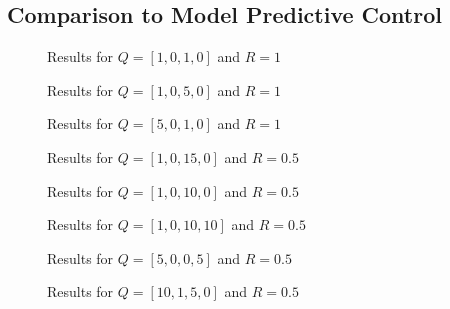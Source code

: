 \subsection{Comparison to Model Predictive Control}\label{sec:prob33}

\begin{figure}[htbp]
	\centering
	\caption{Results for $Q=[1,0,1,0]$ and $R=1$}
	\label{fig:problem3plot_1010_1}
\end{figure}

\begin{figure}[htbp]
	\centering
	\caption{Results for $Q=[1,0,5,0]$ and $R=1$}
	\label{fig:problem3plot_1050_1}
\end{figure}

\begin{figure}[htbp]
	\centering
	\caption{Results for $Q=[5,0,1,0]$ and $R=1$}
	\label{fig:problem3plot_5010_1}
\end{figure}

\begin{figure}[htbp]
	\centering
	\caption{Results for $Q=[1,0,15,0]$ and $R=0.5$}
	\label{fig:problem3plot_10150_0.5}
\end{figure}


\begin{figure}[htbp]
	\centering
	\caption{Results for $Q=[1,0,10,0]$ and $R=0.5$}
	\label{fig:problem3_LQR[1,0,10,0]}
\end{figure}

\begin{figure}[htbp]
	\centering
	\caption{Results for $Q=[1,0,10,10]$ and $R=0.5$}
	\label{fig:problem3_LQR[1,0,10,10]}
\end{figure}

\begin{figure}[htbp]
	\centering
	\caption{Results for $Q=[5,0,0,5]$ and $R=0.5$}
	\label{fig:problem3_LQR[5,0,0,5]}
\end{figure}

\begin{figure}[htbp]
	\centering
	\caption{Results for $Q=[10,1,5,0]$ and $R=0.5$}
	\label{fig:problem3_LQR[10,1,5,0]}
\end{figure}
